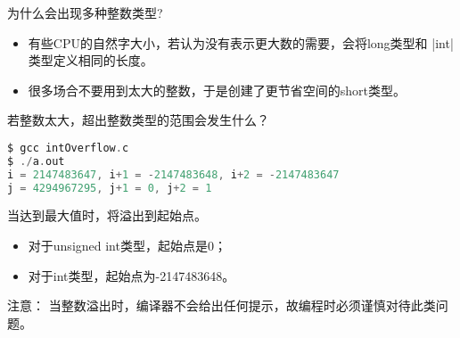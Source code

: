 \begin{frame}[fragile]
  \begin{question}[]{}
    为什么会出现多种整数类型?
  \end{question}
  \pause 

  \begin{itemize}
  \item 有些CPU的自然字大小，若认为没有表示更大数的需要，会将long类型和 \lst|int| 类型定义相同的长度。\\[0.1in]
  \item 很多场合不要用到太大的整数，于是创建了更节省空间的short类型。
  \end{itemize}
\end{frame}

\begin{frame}[fragile]
\begin{question}[]{}
若整数太大，超出整数类型的范围会发生什么？
\end{question}
\end{frame}

\begin{frame}[fragile]

\end{frame}
%
\begin{frame}[fragile]

\begin{lstlisting}[language=c,backgroundcolor=\color{red!10}]
$ gcc intOverflow.c
$ ./a.out
i = 2147483647, i+1 = -2147483648, i+2 = -2147483647
j = 4294967295, j+1 = 0, j+2 = 1
\end{lstlisting}
\end{frame}
%
\begin{frame}[fragile]

当达到最大值时，将溢出到起始点。\vspace{0.05in}
\begin{itemize}
\item 对于unsigned int类型，起始点是0；\\[0.1in]
\item 对于int类型，起始点为-2147483648。
\end{itemize}

\vspace{0.1in}
 注意： 当整数溢出时，编译器不会给出任何提示，故编程时必须谨慎对待此类问题。 

\end{frame}
